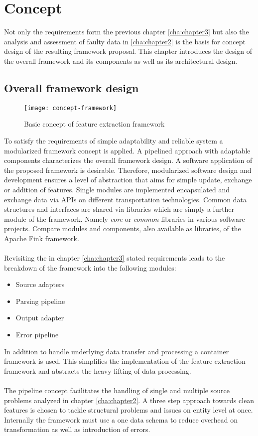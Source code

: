 \chapter{Concept\label{cha:chapter4}}

Not only the requirements form the previous chapter \ref{cha:chapter3} but also the analysis and assessment of faulty data in \ref{cha:chapter2} is the basis for concept design of the resulting framework proposal. This chapter introduces the design of the overall framework and its components as well as its architectural design.

\section{Overall framework design \label{sec:overalldesign}}

\begin{figure}[htb]
  \centering
  \texttt{[image: concept-framework]}\\
  \caption{Basic concept of feature extraction framework}
  \label{fig:basicconcept}
\end{figure}

To satisfy the requirements of simple adaptability and reliable system a modularized framework concept is applied. A pipelined approach with adaptable components characterizes the overall framework design. A software application of the proposed framework is desirable. Therefore, modularized software design and development ensures a level of abstraction that aims for simple update, exchange or addition of features. Single modules are implemented encapsulated and exchange data via APIs on different transportation technologies. Common data structures and interfaces are shared via libraries which are simply a further module of the framework. Namely \textit{core} or \textit{common} libraries in various software projects. Compare modules and components, also available as libraries, of the Apache Fink framework. %
\\\\
Revisiting the in chapter \ref{cha:chapter3} stated requirements leads to the breakdown of the framework into the following modules:
\begin{itemize}
\item Source adapters
\item Parsing pipeline
\item Output adapter
\item Error pipeline
\end{itemize}
In addition to handle underlying data transfer and processing a container framework is used. This simplifies the implementation of the feature extraction framework and abstracts the heavy lifting of data processing.
\\\\
The pipeline concept facilitates the handling of single and multiple source problems analyzed in chapter \ref{cha:chapter2}. A three step approach towards clean features is chosen to tackle structural problems and issues on entity level at once. Internally the framework must use a one data schema to reduce overhead on transformation as well as introduction of errors.


